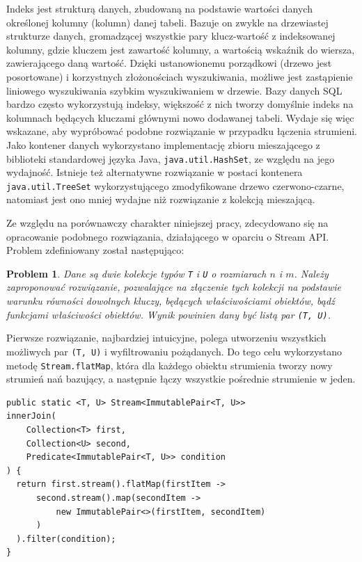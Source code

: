 \documentclass[12pt,twoside,openright]{extarticle}
\newtheorem{theorem}{Problem}
\begin{document}
    Indeks jest strukturą danych, zbudowaną na podstawie wartości danych określonej kolumny (kolumn) danej tabeli. Bazuje on zwykle na drzewiastej strukturze danych, gromadzącej wszystkie pary klucz-wartość z indeksowanej kolumny, gdzie kluczem jest zawartość kolumny, a wartością wskaźnik do wiersza, zawierającego daną wartość. Dzięki ustanowionemu porządkowi (drzewo jest posortowane) i korzystnych złożonościach wyszukiwania, możliwe jest zastąpienie liniowego wyszukiwania szybkim wyszukiwaniem w drzewie. Bazy danych SQL bardzo często wykorzystują indeksy, większość z nich tworzy domyślnie indeks na kolumnach będących kluczami głównymi nowo dodawanej tabeli. Wydaje się więc wskazane, aby wypróbować podobne rozwiązanie w przypadku łączenia strumieni. Jako kontener danych wykorzystano implementację zbioru mieszającego z biblioteki standardowej języka Java, \texttt{java.util.HashSet}, ze względu na jego wydajność. Istnieje też alternatywne rozwiązanie w postaci kontenera \texttt{java.util.TreeSet} wykorzystującego zmodyfikowane drzewo czerwono-czarne, natomiast jest ono mniej wydajne niż rozwiązanie z kolekcją mieszającą.

    Ze względu na porównawczy charakter niniejszej pracy, zdecydowano się na opracowanie podobnego rozwiązania, działającego w oparciu o Stream API. Problem zdefiniowany został następująco:

\begin{theorem}
    Dane są dwie kolekcje typów \texttt{T} i \texttt{U} o rozmiarach $ n $ i $ m $. Należy zaproponować rozwiązanie, pozwalające na złączenie tych kolekcji na podstawie warunku równości dowolnych kluczy, będących właściwościami obiektów, bądź funkcjami właściwości obiektów. Wynik powinien dany być listą par \texttt{(T, U)}.
\end{theorem}

    Pierwsze rozwiązanie, najbardziej intuicyjne, polega utworzeniu wszystkich możliwych par \texttt{(T, U)} i wyfiltrowaniu pożądanych. Do tego celu wykorzystano metodę \texttt{Stream.flatMap}, która dla każdego obiektu strumienia tworzy nowy strumień nań bazujący, a następnie łączy wszystkie pośrednie strumienie w jeden.

\begin{lstlisting}[label=join1, caption=Rozwiązanie nr 1]
public static <T, U> Stream<ImmutablePair<T, U>>
innerJoin(
    Collection<T> first,
    Collection<U> second,
    Predicate<ImmutablePair<T, U>> condition
) {
  return first.stream().flatMap(firstItem ->
      second.stream().map(secondItem ->
          new ImmutablePair<>(firstItem, secondItem)
      )
  ).filter(condition);
}

\end{lstlisting}
\end{document}
